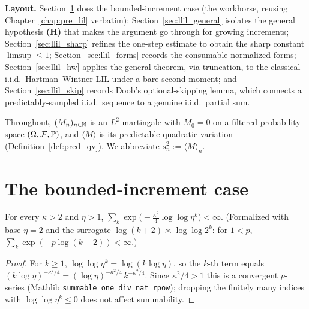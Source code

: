 \medskip
\noindent\textbf{Layout.} Section~\ref{sec:llil_bounded} does the bounded-increment
case (the workhorse, reusing Chapter~\ref{chap:pre_lil} verbatim);
Section~\ref{sec:llil_general} isolates the general hypothesis \textbf{(H)} that makes
the argument go through for growing increments;
Section~\ref{sec:llil_sharp} refines the one-step estimate to obtain the sharp
constant $\limsup\le1$; Section~\ref{sec:llil_forms} records the consumable normalized
forms; Section~\ref{sec:llil_hw} applies the general theorem, via truncation, to the
classical i.i.d.\ Hartman--Wintner LIL under a bare second moment; and
Section~\ref{sec:llil_skip} records Doob's optional-skipping lemma, which connects a
predictably-sampled i.i.d.\ sequence to a genuine i.i.d.\ partial sum.

Throughout, $(M_n)_{n\in\mathbb{N}}$ is an $L^2$-martingale with $M_0=0$ on a filtered
probability space $(\Omega,\mathcal{F},\mathbb{P})$, and $\langle M\rangle$ is its predictable
quadratic variation (Definition~\ref{def:pred_qv}). We abbreviate
$s_n^2:=\langle M\rangle_n$.

\section{The bounded-increment case}
\label{sec:llil_bounded}

\begin{lemma}\label{lem:llil_tail_summable}
\leanok
For every $\kappa>2$ and $\eta>1$,
$\sum_{k}\exp\!\big(-\tfrac{\kappa^2}{4}\log\log\eta^k\big)<\infty$. (Formalized with base $\eta=2$
and the surrogate $\log(k+2)\asymp\log\log 2^k$: for $1<p$, $\sum_k\exp(-p\log(k+2))<\infty$.)
\end{lemma}
\begin{proof}\leanok
For $k\ge1$, $\log\log\eta^k=\log(k\log\eta)$, so the $k$-th term equals
$(k\log\eta)^{-\kappa^2/4}=(\log\eta)^{-\kappa^2/4}\,k^{-\kappa^2/4}$. Since
$\kappa^2/4>1$ this is a convergent $p$-series (Mathlib
\texttt{summable\_one\_div\_nat\_rpow}); dropping the finitely many indices with
$\log\log\eta^k\le0$ does not affect summability.
\end{proof}

